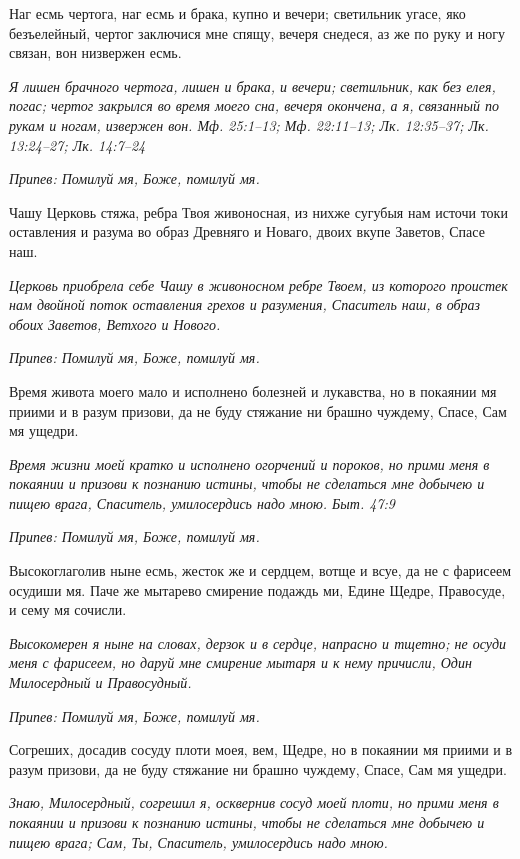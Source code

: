 Наг есмь чертога, наг есмь и брака, купно и вечери; светильник угасе, яко безъелейный, чертог заключися мне спящу, вечеря снедеся, аз же по руку и ногу связан, вон низвержен есмь.


\itshape Я лишен брачного чертога, лишен и брака, и вечери; светильник, как без елея, погас; чертог закрылся во время моего сна, вечеря окончена, а я, связанный по рукам и ногам, извержен вон. Мф. 25:1–13; Мф. 22:11–13; Лк. 12:35–37; Лк. 13:24–27; Лк. 14:7–24\normalfont{}


\itshape Припев:\normalfont{} Помилуй мя, Боже, помилуй мя.


Чашу Церковь стяжа, ребра Твоя живоносная, из нихже сугубыя нам источи токи оставления и разума во образ Древняго и Новаго, двоих вкупе Заветов, Спасе наш.


\itshape Церковь приобрела себе Чашу в живоносном ребре Твоем, из которого проистек нам двойной поток оставления грехов и разумения, Спаситель наш, в образ обоих Заветов, Ветхого и Нового.\normalfont{}


\itshape Припев:\normalfont{} Помилуй мя, Боже, помилуй мя.


Время живота моего мало и исполнено болезней и лукавства, но в покаянии мя приими и в разум призови, да не буду стяжание ни брашно чуждему, Спасе, Сам мя ущедри.


\itshape Время жизни моей кратко и исполнено огорчений и пороков, но прими меня в покаянии и призови к познанию истины, чтобы не сделаться мне добычею и пищею врага, Спаситель, умилосердись надо мною. Быт. 47:9\normalfont{}


\itshape Припев:\normalfont{} Помилуй мя, Боже, помилуй мя.


Высокоглаголив ныне есмь, жесток же и сердцем, вотще и всуе, да не с фарисеем осудиши мя. Паче же мытарево смирение подаждь ми, Едине Щедре, Правосуде, и сему мя сочисли.


\itshape Высокомерен я ныне на словах, дерзок и в сердце, напрасно и тщетно; не осуди меня с фарисеем, но даруй мне смирение мытаря и к нему причисли, Один Милосердный и Правосудный.\normalfont{}


\itshape Припев:\normalfont{} Помилуй мя, Боже, помилуй мя.


Согреших, досадив сосуду плоти моея, вем, Щедре, но в покаянии мя приими и в разум призови, да не буду стяжание ни брашно чуждему, Спасе, Сам мя ущедри.


\itshape Знаю, Милосердный, согрешил я, осквернив сосуд моей плоти, но прими меня в покаянии и призови к познанию истины, чтобы не сделаться мне добычею и пищею врага; Сам, Ты, Спаситель, умилосердись надо мною.\normalfont{}


